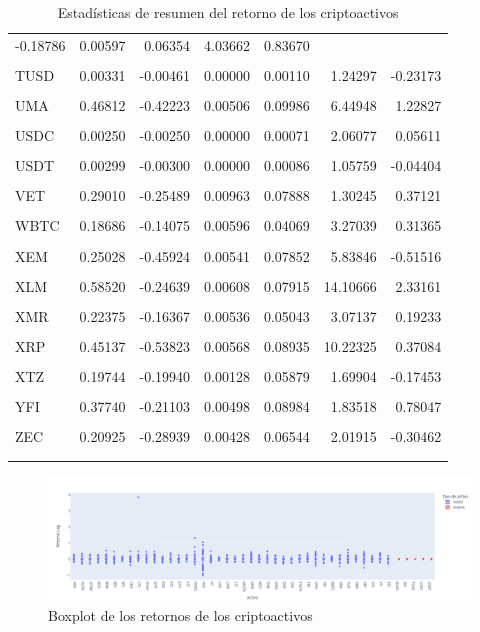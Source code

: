 \documentclass[runningheads,a4paper,10pt]{etc/llncs}
\begin{document}
\begin{longtable}{lrrrrrr}
-0.18786 &  0.00597 &             0.06354 &   4.03662 &  0.83670 \\\\\n TUSD &  0.00331 & -0.00461 &  0.00000 &             0.00110 &   1.24297 & -0.23173 \\\\\n  UMA &  0.46812 & -0.42223 &  0.00506 &             0.09986 &   6.44948 &  1.22827 \\\\\n USDC &  0.00250 & -0.00250 &  0.00000 &             0.00071 &   2.06077 &  0.05611 \\\\\n USDT &  0.00299 & -0.00300 &  0.00000 &             0.00086 &   1.05759 & -0.04404 \\\\\n  VET &  0.29010 & -0.25489 &  0.00963 &             0.07888 &   1.30245 &  0.37121 \\\\\n WBTC &  0.18686 & -0.14075 &  0.00596 &             0.04069 &   3.27039 &  0.31365 \\\\\n  XEM &  0.25028 & -0.45924 &  0.00541 &             0.07852 &   5.83846 & -0.51516 \\\\\n  XLM &  0.58520 & -0.24639 &  0.00608 &             0.07915 &  14.10666 &  2.33161 \\\\\n  XMR &  0.22375 & -0.16367 &  0.00536 &             0.05043 &   3.07137 &  0.19233 \\\\\n  XRP &  0.45137 & -0.53823 &  0.00568 &             0.08935 &  10.22325 &  0.37084 \\\\\n  XTZ &  0.19744 & -0.19940 &  0.00128 &             0.05879 &   1.69904 & -0.17453 \\\\\n  YFI &  0.37740 & -0.21103 &  0.00498 &             0.08984 &   1.83518 &  0.78047 \\\\\n  ZEC &  0.20925 & -0.28939 &  0.00428 &             0.06544 &   2.01915 & -0.30462 \\\\\n
\bottomrule
\n
\caption{Estadísticas de resumen del retorno de los criptoactivos}
\label{tab:desc_stats}
\end{longtable}

\begin{figure}[htp]
    \centering
    \includegraphics[scale=0.3]{images/box_returns.png}
    \caption{Boxplot de los retornos de los criptoactivos}
    \label{fig:box_returns}
\end{figure}
\end{document}
